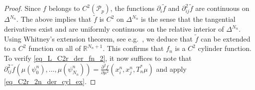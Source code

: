 \documentclass{article}
\theoremstyle{definition}
\numberwithin{equation}{section}
\numberwithin{theorem}{section}
\newcommand{\R}{\mathbb{R}}
\newcommand{\Pcal}{{\mathcal P}}
\begin{document}
\begin{proof}
Since $f$ belongs to $C^2(\Pcal_p)$, the functions $\partial_i\tilde f$ and $\partial^2_{ij}\tilde f$ are continuous on $\Delta^{N_n}$.
The above implies that $\tilde f$ is $C^2$ on $\Delta^{N_n}$ is the sense that the tangential derivatives exist and are uniformly continuous on the relative interior of $\Delta^{N_n}$. Using Whitney's extension theorem, see e.g.\ \citep[Appendix, Corollary~6.3]{MR838085}, we deduce that $\tilde f$ can be extended to a $C^2$ function on all of $\R^{N_n+1}$.
This confirms that $f_n$ is a $C^2$ cylinder function. 
To verify \eqref{eq_L_C2r_der_fn_2}, it now suffices to note that $\partial^2_{ij}\tilde f(\mu(\psi^n_0),\ldots,\mu(\psi^n_{N_n}))=\frac{\partial^2f}{\partial\mu^2}(x^n_i,x^n_j,T_n^*\mu)$ and apply \eqref{eq_C2r_2n_der_cyl_ex}.
\end{proof}
\end{document}
